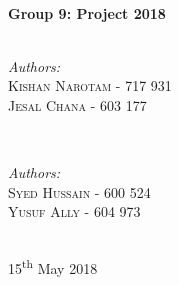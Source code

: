 \documentclass[10pt, conference]{IEEEtran}
\begin{document}
\begin{titlepage}

\HRule \\[0.4cm]
{ \huge \bfseries Group 9: Project 2018}\\[0.4cm] %
\HRule \\[1.5cm]
 
\singlespacing
\begin{minipage}{0.4\textwidth}
\begin{flushleft} \large
	\emph{Authors:}\\
	\textsc{Kishan Narotam - 717 931\\Jesal Chana - 603 177} 
\end{flushleft}
\end{minipage}
~
\begin{minipage}{0.4\textwidth}
\begin{flushright} \large
	\emph{Authors:} \\
	\textsc{Syed Hussain - 600 524\\Yusuf Ally - 604 973} 
\end{flushright}
\end{minipage}\\[1cm]


{\large 15\textsuperscript{th} May 2018}\\[1cm] %


 


\end{titlepage}
\end{document}
